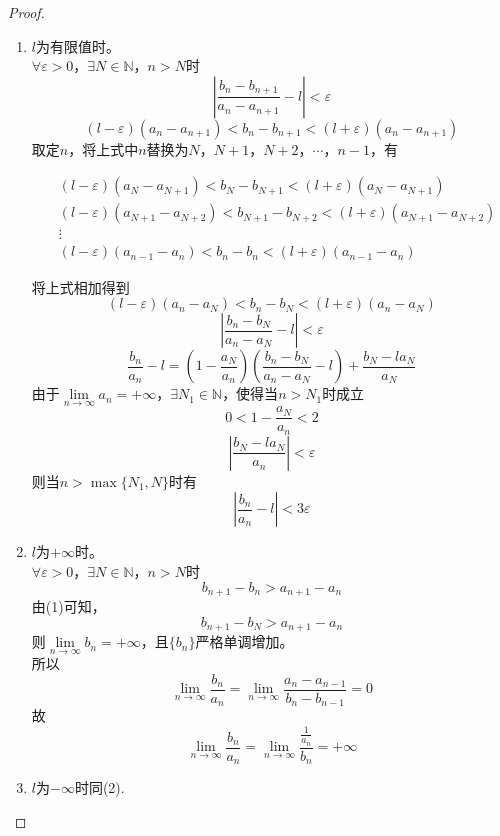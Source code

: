 \begin{proof}

    \begin{enumerate}

        \item
            $l$为有限值时。\\
            $\forall \varepsilon>0$，$\exists N \in \mathbb{N}$，$n > N$时
            $$\left| \dfrac{b_n - b_{n + 1}}{a_n - a_{n + 1}} - l\right| < \varepsilon$$
            $$(l - \varepsilon)(a_n - a_{n + 1}) < b_n - b_{n + 1} < (l + \varepsilon)(a_n - a_{n + 1})$$
            取定$n$，将上式中$n$替换为$N$，$N + 1$，$N + 2$，$\cdots$，$n - 1$，有

            \begin{align*}
                & (l - \varepsilon)(a_{N} - a_{N + 1})<b_{N} - b_{N + 1} < (l + \varepsilon)(a_{N} - a_{N + 1}) \\
                & (l - \varepsilon)(a_{N + 1} - a_{N + 2}) < b_{N + 1} - b_{N + 2} < (l + \varepsilon)(a_{N + 1} - a_{N + 2}) \\
                & \vdots \\
                & (l - \varepsilon)(a_{n - 1} - a_{n}) < b_{n} - b_{n} < (l + \varepsilon)(a_{n - 1} - a_{n})
            \end{align*}

            将上式相加得到
            $$(l - \varepsilon)(a_{n} - a_{N}) < b_{n} - b_{N} < (l + \varepsilon)(a_{n} - a_{N})$$
            $$\left| \dfrac{b_n - b_{N}}{a_n - a_{N}} - l\right| < \varepsilon$$
            $$\dfrac{b_n}{a_n} - l = \left(1 - \dfrac{a_N}{a_n}\right)\left(\dfrac{b_n - b_N}{a_n - a_N} - l\right) + \dfrac{b_N - la_N}{a_N}$$
            由于$\lim\limits_{n \to \infty}{a_n} = +\infty$，$\exists N_1 \in \mathbb{N}$，使得当$n > N_1$时成立
            $$0 < 1 - \dfrac{a_N}{a_n} < 2$$
            $$\left|\dfrac{b_N - la_N}{a_n}\right| < \varepsilon$$
            则当$n>\max\{N_1, N\}$时有
            $$\left|\dfrac{b_n}{a_n} - l\right| < 3\varepsilon$$

        \item
            $l$为$+\infty$时。\\
            $\forall \varepsilon>0$，$\exists N \in \mathbb{N}$，$n > N$时
            $$b_{n + 1} - b_n > a_{n + 1} - a_n$$
            由\textup{(1)}可知，
            $$b_{n + 1} - b_N > a_{n + 1} - a_n$$
            则$\lim\limits_{n \to \infty}{b_n} = +\infty$，且$\{b_n\}$严格单调增加。\\
            所以
            $$\lim\limits_{n \to \infty}{\dfrac{b_n}{a_n}} = \lim\limits_{n \to \infty}{\dfrac{a_n - a_{n - 1}}{b_n - b_{n - 1}}} = 0$$
            故
            $$\lim\limits_{n \to \infty}{\dfrac{b_n}{a_n}} = \lim\limits_{n \to \infty}{\dfrac{\frac{1}{a_n}}{b_n}} = +\infty$$

        \item $l$为$-\infty$时同\textup{(2)}.

    \end{enumerate}

\end{proof}

